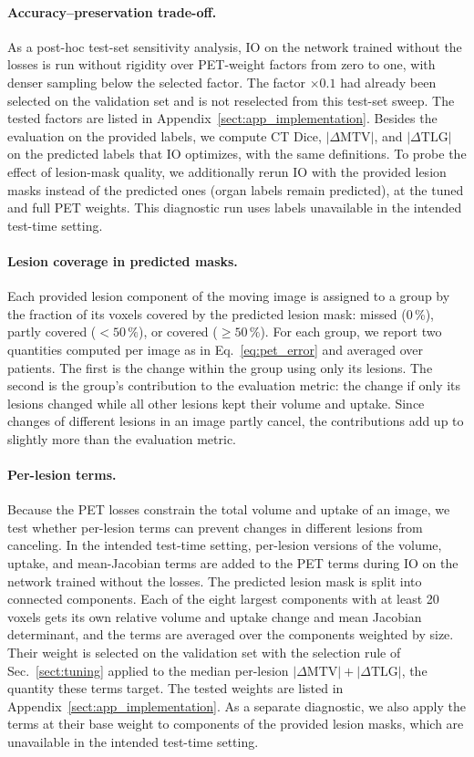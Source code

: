 \paragraph{Accuracy--preservation trade-off.}
As a post-hoc test-set sensitivity analysis, IO on the network trained without the losses is run without rigidity over PET-weight factors from zero to one, with denser sampling below the selected factor.
The factor $\times0.1$ had already been selected on the validation set and is not reselected from this test-set sweep.
The tested factors are listed in Appendix~\ref{sect:app_implementation}.
Besides the evaluation on the provided labels, we compute CT Dice, $|\Delta\mathrm{MTV}|$, and $|\Delta\mathrm{TLG}|$ on the predicted labels that IO optimizes, with the same definitions.
To probe the effect of lesion-mask quality, we additionally rerun IO with the provided lesion masks instead of the predicted ones (organ labels remain predicted), at the tuned and full PET weights.
This diagnostic run uses labels unavailable in the intended test-time setting.

\paragraph{Lesion coverage in predicted masks.}
Each provided lesion component of the moving image is assigned to a group by the fraction of its voxels covered by the predicted lesion mask: missed (0\,\%), partly covered ($<50\,\%$), or covered ($\geq50\,\%$).
For each group, we report two quantities computed per image as in Eq.~\eqref{eq:pet_error} and averaged over patients.
The first is the change within the group using only its lesions.
The second is the group's contribution to the evaluation metric: the change if only its lesions changed while all other lesions kept their volume and uptake.
Since changes of different lesions in an image partly cancel, the contributions add up to slightly more than the evaluation metric.
\paragraph{Per-lesion terms.}
Because the PET losses constrain the total volume and uptake of an image, we test whether per-lesion terms can prevent changes in different lesions from canceling.
In the intended test-time setting, per-lesion versions of the volume, uptake, and mean-Jacobian terms are added to the PET terms during IO on the network trained without the losses.
The predicted lesion mask is split into connected components.
Each of the eight largest components with at least 20 voxels gets its own relative volume and uptake change and mean Jacobian determinant, and the terms are averaged over the components weighted by size.
Their weight is selected on the validation set with the selection rule of Sec.~\ref{sect:tuning} applied to the median per-lesion $|\Delta\mathrm{MTV}|+|\Delta\mathrm{TLG}|$, the quantity these terms target.
The tested weights are listed in Appendix~\ref{sect:app_implementation}.
As a separate diagnostic, we also apply the terms at their base weight to components of the provided lesion masks, which are unavailable in the intended test-time setting.


